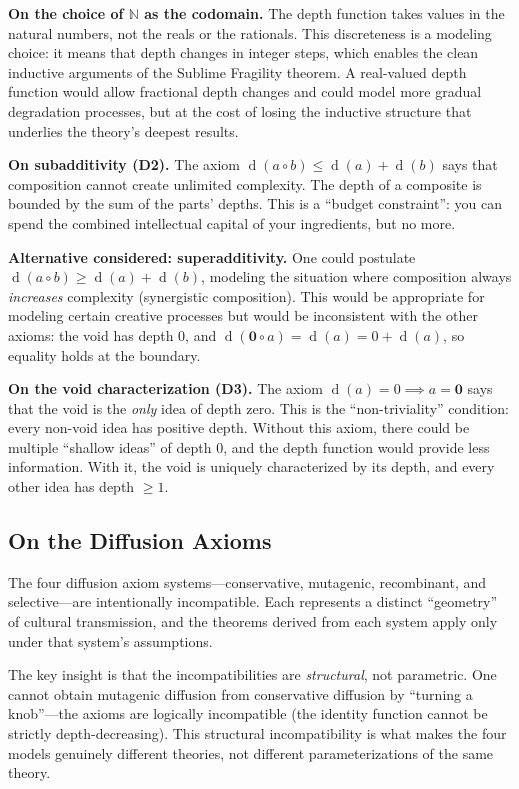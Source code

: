 \documentclass[11pt,openany]{book}
\theoremstyle{definition}
\theoremstyle{plain}
\theoremstyle{remark}
\newcommand{\compose}{\circ}                 %
\newcommand{\void}{\mathbf{0}}              %
\newcommand{\depth}{\operatorname{d}}       %
\begin{document}
\textbf{On the choice of $\mathbb{N}$ as the codomain.} The depth function takes values in the natural numbers, not the reals or the rationals. This discreteness is a modeling choice: it means that depth changes in integer steps, which enables the clean inductive arguments of the Sublime Fragility theorem. A real-valued depth function would allow fractional depth changes and could model more gradual degradation processes, but at the cost of losing the inductive structure that underlies the theory's deepest results.

\textbf{On subadditivity (D2).} The axiom $\depth(a \compose b) \leq \depth(a) + \depth(b)$ says that composition cannot create unlimited complexity. The depth of a composite is bounded by the sum of the parts' depths. This is a ``budget constraint'': you can spend the combined intellectual capital of your ingredients, but no more.

\textbf{Alternative considered: superadditivity.} One could postulate $\depth(a \compose b) \geq \depth(a) + \depth(b)$, modeling the situation where composition always \emph{increases} complexity (synergistic composition). This would be appropriate for modeling certain creative processes but would be inconsistent with the other axioms: the void has depth 0, and $\depth(\void \compose a) = \depth(a) = 0 + \depth(a)$, so equality holds at the boundary.

\textbf{On the void characterization (D3).} The axiom $\depth(a) = 0 \implies a = \void$ says that the void is the \emph{only} idea of depth zero. This is the ``non-triviality'' condition: every non-void idea has positive depth. Without this axiom, there could be multiple ``shallow ideas'' of depth 0, and the depth function would provide less information. With it, the void is uniquely characterized by its depth, and every other idea has depth $\geq 1$.

\subsection{On the Diffusion Axioms}

The four diffusion axiom systems---conservative, mutagenic, recombinant, and selective---are intentionally incompatible. Each represents a distinct ``geometry'' of cultural transmission, and the theorems derived from each system apply only under that system's assumptions.

The key insight is that the incompatibilities are \emph{structural}, not parametric. One cannot obtain mutagenic diffusion from conservative diffusion by ``turning a knob''---the axioms are logically incompatible (the identity function cannot be strictly depth-decreasing). This structural incompatibility is what makes the four models genuinely different theories, not different parameterizations of the same theory.
\end{document}
